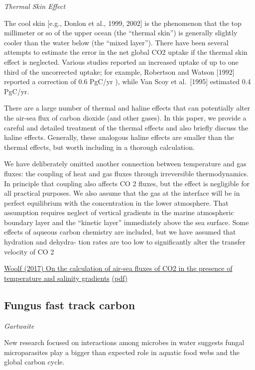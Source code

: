 \documentclass[
]{book}
\begin{document}
\emph{Thermal Skin Effect}

The cool skin {[}e.g., Donlon et al., 1999, 2002{]} is the phenomenon that the top millimeter or so of the upper
ocean (the ``thermal skin'') is generally slightly cooler than the water below (the ``mixed layer''). There have
been several attempts to estimate the error in the net global CO2 uptake if the thermal skin effect is
neglected. Various studies reported an increased uptake of up to one third of the uncorrected uptake; for
example, Robertson and Watson {[}1992{]} reported a correction of 0.6 PgC/yr ), while Van Scoy et al.~{[}1995{]}
estimated 0.4 PgC/yr.

There are a large number of thermal and haline effects that can potentially alter the air-sea ﬂux of carbon
dioxide (and other gases). In this paper, we provide a careful and detailed treatment of the thermal effects
and also brieﬂy discuss the haline effects.
Generally, these analogous haline effects are
smaller than the thermal effects, but worth including in a thorough calculation.

We have deliberately omitted another connection between temperature and gas ﬂuxes: the coupling of
heat and gas ﬂuxes through irreversible thermodynamics. In principle that coupling also affects CO 2 ﬂuxes,
but the effect is negligible for all practical purposes.
We also assume that the gas at the interface will be in perfect equilibrium with the concentration
in the lower atmosphere. That assumption requires neglect of vertical gradients in the marine atmospheric
boundary layer and the ``kinetic layer'' immediately above the sea surface.
Some effects of aqueous carbon chemistry are included, but we have assumed that hydration and dehydra-
tion rates are too low to signiﬁcantly alter the transfer velocity of CO 2

\href{https://agupubs.onlinelibrary.wiley.com/doi/full/10.1002/2015JC011427}{Woolf (2017) On the calculation of air-sea fluxes of CO2 in the presence of temperature and salinity gradients}
\href{pdf/Woolf_2016_Air-Sea_fluxes_of_CO2.pdf}{(pdf)}

\hypertarget{fungus-fast-track-carbon}{%
\subsection{Fungus fast track carbon}\label{fungus-fast-track-carbon}}

\emph{Gartwaite}

New research focused on interactions among microbes in water suggests fungal microparasites play a bigger than expected role in aquatic food webs and the global carbon cycle.
\end{document}

